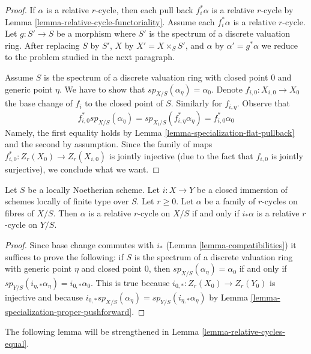 \begin{proof}
If $\alpha$ is a relative $r$-cycle, then each pull back $f_i^*\alpha$ is a
relative $r$-cycle by Lemma \ref{lemma-relative-cycle-functoriality}.
Assume each $f_i^*\alpha$ is a relative $r$-cycle.
Let $g : S' \to S$ be a morphism where $S'$ is the spectrum of a discrete
valuation ring. After replacing $S$ by $S'$, $X$ by $X' = X \times_S S'$, and
$\alpha$ by $\alpha' = g^*\alpha$
we reduce to the problem studied in the next paragraph.

\medskip\noindent
Assume $S$ is the spectrum of a discrete valuation ring with closed
point $0$ and generic point $\eta$. We have to show that
$sp_{X/S}(\alpha_\eta) = \alpha_0$. Denote $f_{i, 0} : X_{i, 0} \to X_0$
the base change of $f_i$ to the closed point of $S$. Similarly
for $f_{i, \eta}$.
Observe that
$$
f_{i, 0}^*sp_{X/S}(\alpha_\eta) =
sp_{X_i/S}(f_{i, \eta}^*\alpha_\eta) = f_{i, 0}^*\alpha_0
$$
Namely, the first equality holds by
Lemma \ref{lemma-specialization-flat-pullback}
and the second by assumption. Since the family of maps
$f_{i, 0}^* : Z_r(X_0) \to Z_r(X_{i, 0})$ is jointly
injective (due to the fact that $f_{i, 0}$ is jointly
surjective), we conclude what we want.
\end{proof}

\begin{lemma}
\label{lemma-check-after-closed}
Let $S$ be a locally Noetherian scheme. Let $i : X \to Y$ be a closed immersion
of schemes locally of finite type over $S$. Let $r \geq 0$.
Let $\alpha$ be a family of $r$-cycles on fibres of $X/S$.
Then $\alpha$ is a relative $r$-cycle on $X/S$ if and only if
$i_*\alpha$ is a relative $r$-cycle on $Y/S$.
\end{lemma}

\begin{proof}
Since base change commutes with $i_*$ (Lemma \ref{lemma-compatibilities})
it suffices to prove the following: if $S$ is the spectrum of a discrete
valuation ring with generic point $\eta$ and closed point $0$,
then $sp_{X/S}(\alpha_\eta) = \alpha_0$ if and only if
$sp_{Y/S}(i_{\eta, *}\alpha_\eta) = i_{0, *}\alpha_0$.
This is true because $i_{0, *} : Z_r(X_0) \to Z_r(Y_0)$
is injective and because $i_{0, *}sp_{X/S}(\alpha_\eta) =
sp_{Y/S}(i_{\eta, *}\alpha_\eta)$ by
Lemma \ref{lemma-specialization-proper-pushforward}.
\end{proof}

\noindent
The following lemma will be strengthened in
Lemma \ref{lemma-relative-cycles-equal}.

